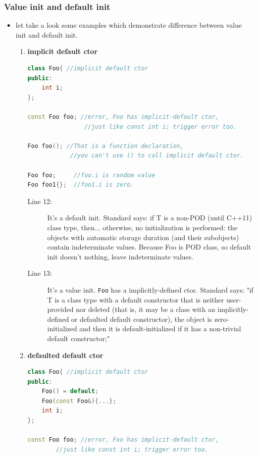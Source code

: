 \documentclass[a4paper,11pt,twoside]{book}
\begin{document}
\subsubsection{Value init and default init}
\begin{itemize}
 
	\item let take a look some examples which demonstrate difference between value init and default init.
	\begin{enumerate}
		\item \textbf{implicit default ctor}
\begin{lstlisting}[frame=single, language=c++]
class Foo{ //implicit default ctor
public:
	int i;
};

const Foo foo; //error, Foo has implicit-default ctor, 
				//just like const int i; trigger error too.
				
Foo foo(); //That is a function declaration, 
			//you can't use () to call implicit default ctor.

Foo foo;     //foo.i is random value
Foo foo1{};	 //foo1.i is zero.		 
\end{lstlisting}

\begin{description}			
\item[Line 12:]	 It's a default init. Standard says: if T is a non-POD (until C++11) class type, then... otherwise, no initialization is performed: the objects with automatic storage duration (and their subobjects) contain indeterminate values.
Because Foo is POD class, so default init doesn't nothing, leave indeterminate values.

\item[Line 13:]  It's a value init. \texttt{Foo} has a implicitly-defined ctor. Standard says: "if T is a class type with a default constructor that is neither user-provided nor deleted (that is, it may be a class with an implicitly-defined or defaulted default constructor), the object is zero-initialized and then it is default-initialized if it has a non-trivial default constructor;"
\end{description}

		\item \textbf{defaulted default ctor}
\begin{lstlisting}[frame=single, language=c++]
class Foo{ //implicit default ctor
public:
	Foo() = default;
	Foo(const Foo&){...};
	int i;
};
	
const Foo foo; //error, Foo has implicit-default ctor, 
		//just like const int i; trigger error too.
	

\end{lstlisting}
\end{enumerate}
\end{itemize}
\end{document}
